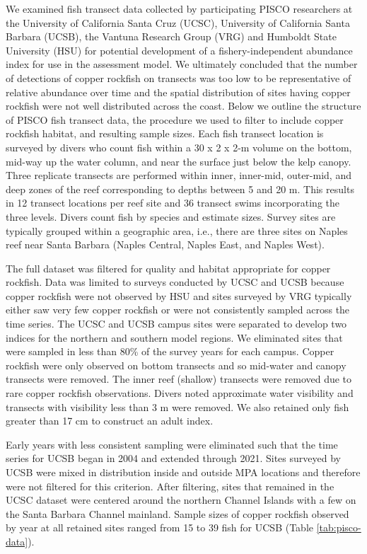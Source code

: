 \documentclass[11pt,
  english,
  letterpaper,
]{article}
\begin{document}
We examined fish transect data collected by participating PISCO researchers at the University of California Santa Cruz (UCSC), University of California Santa Barbara (UCSB), the Vantuna Research Group (VRG) and Humboldt State University (HSU) for potential development of a fishery-independent abundance index for use in the assessment model. We ultimately concluded that the number of detections of copper rockfish on transects was too low to be representative of relative abundance over time and the spatial distribution of sites having copper rockfish were not well distributed across the coast. Below we outline the structure of PISCO fish transect data, the procedure we used to filter to include copper rockfish habitat, and resulting sample sizes. Each fish transect location is surveyed by divers who count fish within a 30 x 2 x 2-m volume on the bottom, mid-way up the water column, and near the surface just below the kelp canopy. Three replicate transects are performed within inner, inner-mid, outer-mid, and deep zones of the reef corresponding to depths between 5 and 20 m. This results in 12 transect locations per reef site and 36 transect swims incorporating the three levels. Divers count fish by species and estimate sizes. Survey sites are typically grouped within a geographic area, i.e., there are three sites on Naples reef near Santa Barbara (Naples Central, Naples East, and Naples West).

The full dataset was filtered for quality and habitat appropriate for copper rockfish. Data was limited to surveys conducted by UCSC and UCSB because copper rockfish were not observed by HSU and sites surveyed by VRG typically either saw very few copper rockfish or were not consistently sampled across the time series. The UCSC and UCSB campus sites were separated to develop two indices for the northern and southern model regions. We eliminated sites that were sampled in less than 80\% of the survey years for each campus. Copper rockfish were only observed on bottom transects and so mid-water and canopy transects were removed. The inner reef (shallow) transects were removed due to rare copper rockfish observations. Divers noted approximate water visibility and transects with visibility less than 3 m were removed. We also retained only fish greater than 17 cm to construct an adult index.

Early years with less consistent sampling were eliminated such that the time series for UCSB began in 2004 and extended through 2021. Sites surveyed by UCSB were mixed in distribution inside and outside MPA locations and therefore were not filtered for this criterion. After filtering, sites that remained in the UCSC dataset were centered around the northern Channel Islands with a few on the Santa Barbara Channel mainland. Sample sizes of copper rockfish observed by year at all retained sites ranged from 15 to 39 fish for UCSB (Table \ref{tab:pisco-data}).
\end{document}
